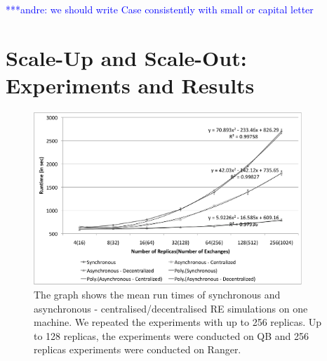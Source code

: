 \documentclass{rspublic}
\newcommand{\jhanote}[1]{ {\textcolor{red} { ***shantenu: #1 }}}
\newcommand{\alnote}[1]{ {\textcolor{blue} { ***andre: #1 }}}
\newcommand{\alnote}[1]{}
\newcommand{\jhanote}[1]{}
\begin{document}
\alnote{we should write Case consistently with small or capital letter}

\section{Scale-Up and Scale-Out: Experiments and Results}

%
\begin{figure}
\centering
\includegraphics[width=0.9\textwidth]{../data/scale_up.pdf}
\caption{\small The graph shows the mean run times of synchronous and asynchronous - centralised/decentralised RE simulations on one machine. We repeated the experiments with up to 256 replicas. Up to 128 replicas, the experiments were conducted on QB and 256 replicas experiments were conducted on Ranger.}
\label{fig:graph}
\vspace{-1em}
\end{figure}
\end{document}
